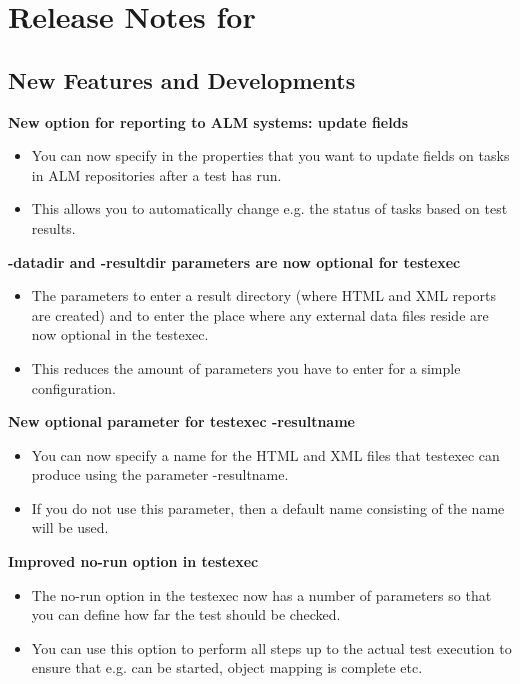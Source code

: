 \makeatletter
\section{Release Notes for \@bxversion}
\makeatother

\subsection{New Features and Developments}

\textbf{New option for reporting to ALM systems: update fields}
\begin{itemize}
\item You can now specify in the \gdproject{} properties that you want to update fields on tasks in ALM repositories after a test has run.
\item This allows you to automatically change e.g. the status of tasks based on test results.
\end{itemize}

\textbf{-datadir and -resultdir parameters are now optional for testexec}
\begin{itemize}
\item The parameters to enter a result directory (where HTML and XML reports are created) and to enter the place where any external data files reside are now optional in the testexec.
\item This reduces the amount of parameters you have to enter for a simple configuration.
\end{itemize}

\textbf{New optional parameter for testexec -resultname}
\begin{itemize}
\item You can now specify a name for the HTML and XML files that testexec can produce using the parameter -resultname.
\item If you do not use this parameter, then a default name consisting of the \gdsuite{} name will be used.
\end{itemize}

\textbf{Improved no-run option in testexec}
\begin{itemize}
\item The no-run option in the testexec now has a number of parameters so that you can define how far the test should be checked. 
\item You can use this option to perform all steps up to the actual test execution to ensure that e.g. \gdauts{} can be started, object mapping is complete etc.
\end{itemize}

